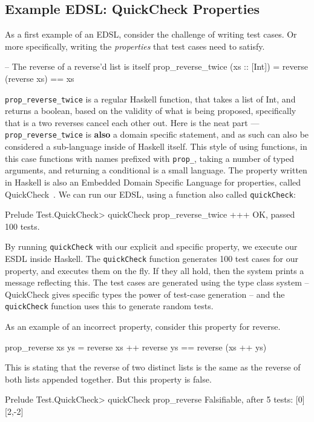 \documentclass[11pt]{article}
\begin{document}
\subsection{Example EDSL: QuickCheck Properties}

As a first example of an EDSL, consider the challenge of writing test cases.
Or more specifically, writing the {\em properties\/} that test cases need to satisfy.

\begin{Code}
-- The reverse of a reverse'd list is itself
prop_reverse_twice (xs :: [Int]) = reverse (reverse xs) == xs
\end{Code}

\verb|prop_reverse_twice| is a regular Haskell function,
that takes a list of Int, and returns a boolean, based
on the validity of what is being proposed, specifically
that is a two reverses cancel each other out. 
Here is the neat part --- \verb|prop_reverse_twice| is {\bf also\/} a
domain specific statement, and as such can also be considered
a sub-language inside of Haskell itself.  This style
of using functions, in this case functions with names
prefixed with \verb|prop_|, taking a number of typed
arguments, and returning a conditional is a small language.
The property written in Haskell is also an Embedded Domain Specific
Language for properties, called QuickCheck~\cite{Claessen:00:QuickCheck}.
We can run our EDSL, using a function also called \verb|quickCheck|:
\begin{Code}
Prelude Test.QuickCheck> quickCheck prop_reverse_twice
+++ OK, passed 100 tests.
\end{Code}
By running \verb|quickCheck| with our explicit and specific property,
we execute our ESDL inside Haskell. The \verb|quickCheck| function
generates 100 test cases for our property, and executes
them on the fly. If they all hold, then the system prints
a message reflecting this. The test cases are generated using
the type class system -- QuickCheck gives specific types the
power of test-case generation -- and the \verb|quickCheck| function
uses this to generate random tests.

As an example of an incorrect property, consider this property for reverse.
\begin{Code}
prop_reverse xs ys = reverse xs ++ reverse ys == reverse (xs ++ ys)
\end{Code}
This is stating that the reverse of two distinct lists
is the same as the reverse of both lists appended together.
But this property is false.
\begin{Code}
Prelude Test.QuickCheck> quickCheck prop_reverse 
Falsifiable, after 5 tests:
[0]
[2,-2]
\end{Code}
\end{document}
